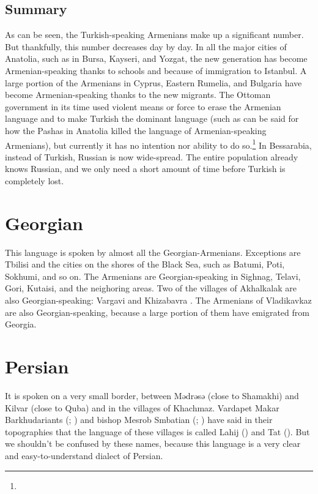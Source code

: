 \subsection{Summary}

As can be seen, the Turkish-speaking Armenians make up a significant number. But thankfully, this number decreases day by day. In all the major cities of Anatolia, such as in Bursa, Kayseri, and Yozgat, the new generation has become Armenian-speaking thanks to schools and because of immigration to Istanbul. A large portion of the Armenians in Cyprus, Eastern Rumelia, and Bulgaria have become Armenian-speaking thanks to the new migrants. The Ottoman government in its time used violent means or force to erase the Armenian language and to make Turkish   the dominant language (such as can be said for how the Pashas in Anatolia killed the language of Armenian-speaking Armenians), but currently it has no intention nor ability to do  so.\footnote{} In Bessarabia, instead of Turkish, Russian is now wide-spread. The entire population already knows Russian, and we only need a short amount of time before Turkish is completely lost. 

\section{Georgian}

This language is spoken by almost all the Georgian-Armenians. Exceptions are Tbilisi and the cities on the shores of the Black Sea, such as Batumi, Poti, Sokhumi, and so on. The Armenians are Georgian-speaking in Sighnag, Telavi, Gori, Kutaisi, and the neighoring areas. Two of the villages of Akhalkalak are also Georgian-speaking: Vargavi and Khizabavra . The Armenians of Vladikavkaz are also Georgian-speaking, because a large portion of them have emigrated from Georgia. 

\section{Persian}

It is spoken on a very small border, between Mədrəsə (close to Shamakhi) and Kilvar (close to Quba) and in the villages of Khachmaz. Vardapet Makar Barkhudariants (; ) and bishop Mesrob Smbatian (; ) have said in their topographies that the language of these villages is called Lahij () and Tat (). But we shouldn't be confused by these names, because this language is a very clear and easy-to-understand dialect of Persian.


